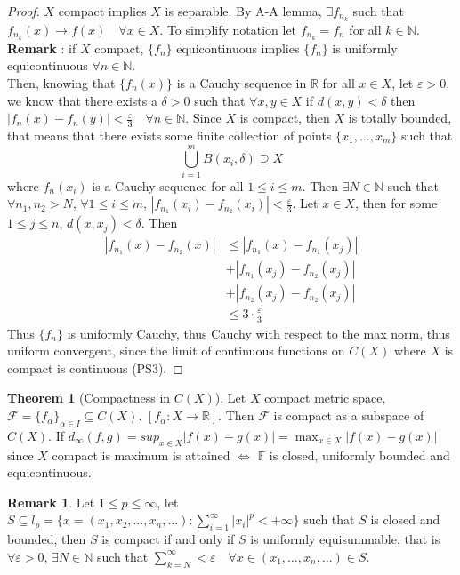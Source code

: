 \documentclass[12pt]{article}
\theoremstyle{definition}
\newtheorem{theorem}{Theorem}[section]
\newtheorem{remark}{Remark}[section]
\begin{document}
\begin{proof}
	$X$ compact implies $X$ is separable. By A-A lemma, $\exists f_{n_k}$ such that $f_{n_k}(x) \to f(x) \quad \forall x \in X$. To simplify notation let $f_{n_k} = f_n$ for all $k \in \mathbb{N}$. \textbf{Remark} : if $X$ compact, $\{f_n\}$ equicontinuous implies $\{f_n\}$ is uniformly equicontinuous $\forall n \in \mathbb{N}$. \\
	Then, knowing that $\{f_n(x)\}$ is a Cauchy sequence in $\mathbb{R}$ for all $x \in X$, let $\varepsilon > 0 $, we know that there exists a $\delta > 0$ such that $\forall x,y \in X$ if $d(x,y) < \delta$ then $|f_n(x) - f_n(y)| < \frac{\varepsilon}{3} \quad \forall n \in \mathbb{N}$. Since $X$ is compact, then $X$ is totally bounded, that means that there exists some finite collection of points $\{x_1,\ldots,x_m\}$ such that 
	$$\bigcup_{i=1}^m B(x_i,\delta) \supseteq X$$
	where $f_n(x_i)$ is a Cauchy sequence for all $1 \leq i \leq m$. Then $\exists N \in \mathbb{N}$ such that $\forall n_1, n_2 >N$, $\forall 1 \leq i \leq m$, $|f_{n_1}(x_i) - f_{n_2}(x_i)| < \frac{\varepsilon}{3}$. Let $x \in X$, then for some $1 \leq j \leq n$, $d(x,x_j) < \delta$. Then 
	\begin{align*}
	|f_{n_1}(x) - f_{n_2}(x)|  &\leq |f_{n_1}(x) - f_{n_1}(x_j)| \\
	&+ |f_{n_1}(x_j) - f_{n_2}(x_j)| \\
	&+ |f_{n_2}(x_j) - f_{n_2}(x_j)| \\
	&\leq 3 \cdot \frac{\varepsilon}{3}
	\end{align*}	
	Thus $\{f_n\}$ is uniformly Cauchy, thus Cauchy with respect to the max norm, thus uniform convergent, since the limit of continuous functions on $C(X)$ where $X$ is compact is continuous (PS3).
	\end{proof}
	\begin{theorem}[Compactness in $C(X)$]
		Let $X$ compact metric space, $\mathcal{F} = \{f_\alpha\}_{\alpha \in I} \subseteq C(X)$. 
		$[f_{\alpha} \colon X \to \mathbb{R}]$. Then $\mathcal{F}$ is compact as a subspace of $C(X)$. If $d_\infty(f,g) = sup_{x \in X} |f(x) - g(x)| = \max_{x \in X} |f(x) - g(x)|$ since $X$ compact is maximum is attained $\iff$ $\mathbb{F}$ is closed, uniformly bounded and equicontinuous.
	\end{theorem}

	\begin{remark}
		Let $1 \leq p \leq \infty$, let $S \subseteq l_p = \{x = (x_1,x_2,\ldots,x_n,\ldots) \colon \sum_{i=1}^\infty |x_i|^p < +\infty\}$ such that $S$ is closed and bounded, then $S$ is compact if and only if $S$ is uniformly equisummable, that is $\forall \varepsilon >0$, $\exists N \in \mathbb{N}$ such that $\sum_{k=N}^\infty < \varepsilon \quad \forall x \in (x_1,\ldots,x_n,\ldots) \in S$.
	\end{remark}
\end{document}
